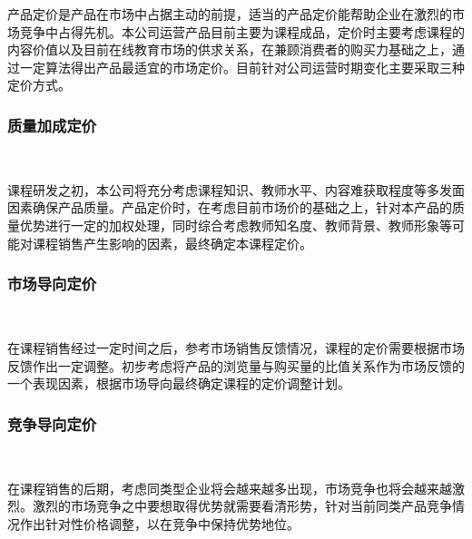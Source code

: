 产品定价是产品在市场中占据主动的前提，适当的产品定价能帮助企业在激烈的市场竞争中占得先机。本公司运营产品目前主要为课程成品，定价时主要考虑课程的内容价值以及目前在线教育市场的供求关系，在兼顾消费者的购买力基础之上，通过一定算法得出产品最适宜的市场定价。目前针对公司运营时期变化主要采取三种定价方式。

\subsubsection{质量加成定价}\

课程研发之初，本公司将充分考虑课程知识、教师水平、内容难获取程度等多发面因素确保产品质量。产品定价时，在考虑目前市场价的基础之上，针对本产品的质量优势进行一定的加权处理，同时综合考虑教师知名度、教师背景、教师形象等可能对课程销售产生影响的因素，最终确定本课程定价。

\subsubsection{市场导向定价}\

在课程销售经过一定时间之后，参考市场销售反馈情况，课程的定价需要根据市场反馈作出一定调整。初步考虑将产品的浏览量与购买量的比值关系作为市场反馈的一个表现因素，根据市场导向最终确定课程的定价调整计划。

\subsubsection{竞争导向定价}\

在课程销售的后期，考虑同类型企业将会越来越多出现，市场竞争也将会越来越激烈。激烈的市场竞争之中要想取得优势就需要看清形势，针对当前同类产品竞争情况作出针对性价格调整，以在竞争中保持优势地位。




